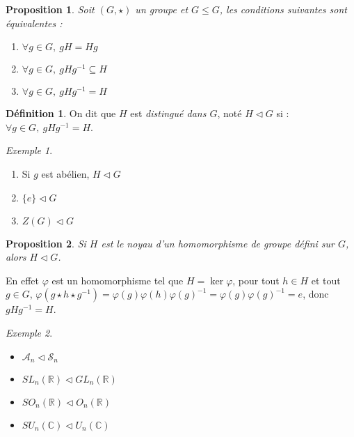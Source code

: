 \documentclass[]{article}
\newtheorem{myproposition}{Proposition}
\theoremstyle{remark}
\newtheorem{myexmpl}{Exemple}
\theoremstyle{definition}
\newtheorem{mydef}{Définition}
\begin{document}
\begin{myproposition}
	Soit $(G, \star)$ un groupe et $G \leqslant G$, les conditions suivantes sont équivalentes :
	\begin{enumerate}
		\item $\forall g \in G, ~ g H = H g$
		\item $\forall g \in G, ~ g H g^{-1} \subseteq H$
		\item $\forall g \in G, ~ g H g^{-1} = H$
	\end{enumerate}
\end{myproposition}

\begin{mydef}
	On dit que $H$ est \textit{distingué dans $G$}, noté  $H \vartriangleleft G$ si :$\forall g \in G, ~ g H g^{-1} = H$.
\end{mydef}

\begin{myexmpl}
	\leavevmode
	\begin{enumerate}
		\item Si $g$ est abélien, $H \vartriangleleft G$
		\item $\{e\} \vartriangleleft G$
		\item $Z(G) \vartriangleleft G$
	\end{enumerate}
\end{myexmpl}

\begin{myproposition}
	Si $H$ est le noyau d'un homomorphisme de groupe défini sur $G$, alors $H \vartriangleleft G$.
\end{myproposition}

En effet $\varphi$ est un homomorphisme tel que $H= \ker \varphi$, pour tout $h \in H$ et tout $g \in G$, $\varphi(g \star h \star g^{-1}) = \varphi(g)\varphi(h)\varphi(g)^{-1}=\varphi(g)\varphi(g)^{-1}=e$, donc $g H g^{-1} = H$.

\begin{myexmpl}
	\leavevmode
	\begin{itemize}
		\item $\mathcal{A}_n \vartriangleleft \mathscr{S}_n$
		\item $SL_n(\mathbb{R}) \vartriangleleft GL_n(\mathbb{R})$
		\item $SO_n(\mathbb{R}) \vartriangleleft O_n(\mathbb{R})$
		\item $SU_n(\mathbb{C}) \vartriangleleft U_n(\mathbb{C})$
	\end{itemize}
\end{myexmpl}
\end{document}
